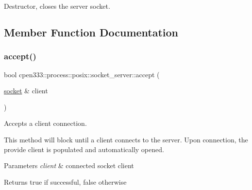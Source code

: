 Destructor, closes the server socket. 



\subsection{Member Function Documentation}
\mbox{\label{classcpen333_1_1process_1_1posix_1_1socket__server_ae68768699a5ddc4550263dd758f4e708}} 
\subsubsection{\texorpdfstring{accept()}{accept()}}
{\footnotesize\ttfamily bool cpen333\+::process\+::posix\+::socket\+\_\+server\+::accept (\begin{DoxyParamCaption}\item[{\hyperlink{classcpen333_1_1process_1_1posix_1_1socket}{socket} \&}]{client }\end{DoxyParamCaption})\hspace{0.3cm}{\ttfamily [inline]}}



Accepts a client connection. 

This method will block until a client connects to the server. Upon connection, the provide client is populated and automatically opened.


\begin{DoxyParams}{Parameters}
{\em client} & connected socket client \\
\hline
\end{DoxyParams}
\begin{DoxyReturn}{Returns}
true if successful, false otherwise 
\end{DoxyReturn}
\mbox{\label{classcpen333_1_1process_1_1posix_1_1socket__server_a2ff19c8146dd6f5dcb72606311fffedd}} 

